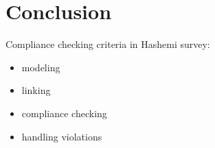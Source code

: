 \chapter{Conclusion}

Compliance checking criteria in Hashemi survey: 

\begin{itemize}
    \item modeling
    \item linking
    \item compliance checking
    \item handling violations
\end{itemize}